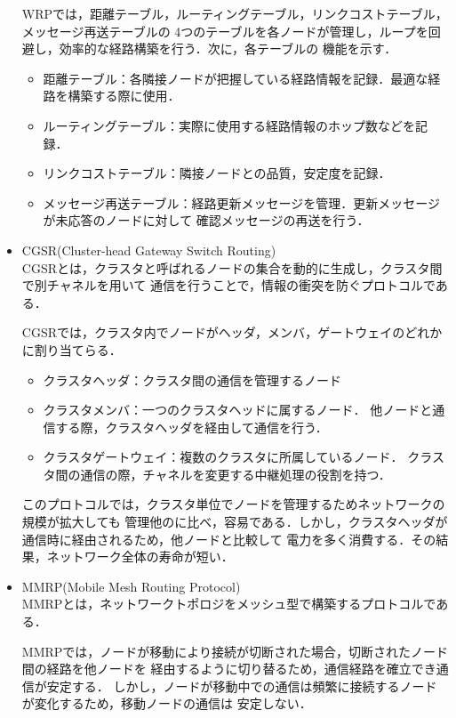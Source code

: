 \documentclass[a4paper, 11pt]{ltjsarticle}
\begin{document}
\begin{itemize}
  WRPでは，距離テーブル，ルーティングテーブル，リンクコストテーブル，メッセージ再送テーブルの
  4つのテーブルを各ノードが管理し，ループを回避し，効率的な経路構築を行う．次に，各テーブルの
  機能を示す．
  \begin{itemize}
    \item 距離テーブル：各隣接ノードが把握している経路情報を記録．最適な経路を構築する際に使用．
    \item ルーティングテーブル：実際に使用する経路情報のホップ数などを記録．
    \item リンクコストテーブル：隣接ノードとの品質，安定度を記録．
    \item メッセージ再送テーブル：経路更新メッセージを管理．更新メッセージが未応答のノードに対して
    確認メッセージの再送を行う．\\
  \end{itemize}

  \item CGSR(Cluster-head Gateway Switch Routing)\cite{CGSR}\\
  CGSRとは，クラスタと呼ばれるノードの集合を動的に生成し，クラスタ間で別チャネルを用いて
  通信を行うことで，情報の衝突を防ぐプロトコルである．

  CGSRでは，クラスタ内でノードがヘッダ，メンバ，ゲートウェイのどれかに割り当てらる．
  \begin{itemize}
    \item クラスタヘッダ：クラスタ間の通信を管理するノード
    \item クラスタメンバ：一つのクラスタヘッドに属するノード．
    他ノードと通信する際，クラスタヘッダを経由して通信を行う．
    \item クラスタゲートウェイ：複数のクラスタに所属しているノード．
    クラスタ間の通信の際，チャネルを変更する中継処理の役割を持つ．
  \end{itemize}

  このプロトコルでは，クラスタ単位でノードを管理するためネットワークの規模が拡大しても
  管理他のに比べ，容易である．しかし，クラスタヘッダが通信時に経由されるため，他ノードと比較して
  電力を多く消費する．その結果，ネットワーク全体の寿命が短い．\\

  \item MMRP(Mobile Mesh Routing Protocol)\cite{MMRP}\\
  MMRPとは，ネットワークトポロジをメッシュ型で構築するプロトコルである．

  MMRPでは，ノードが移動により接続が切断された場合，切断されたノード間の経路を他ノードを
  経由するように切り替るため，通信経路を確立でき通信が安定する．
  しかし，ノードが移動中での通信は頻繁に接続するノードが変化するため，移動ノードの通信は
  安定しない．

\end{itemize}
\end{document}
